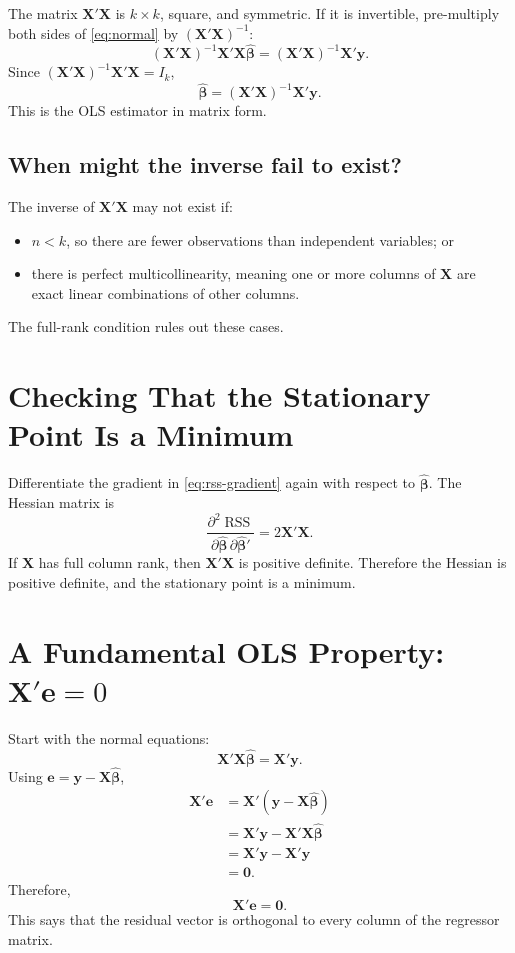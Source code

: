 \documentclass[11pt,a4paper]{article}
\numberwithin{equation}{section}
\newcommand{\bhat}{\hat{\boldsymbol{\beta}}}
\newcommand{\ee}{\mathbf{e}}
\newcommand{\XX}{\mathbf{X}}
\newcommand{\yy}{\mathbf{y}}
\newcommand{\RSS}{\operatorname{RSS}}
\begin{document}
The matrix $\XX'\XX$ is $k\times k$, square, and symmetric. If it is invertible, pre-multiply both sides of \eqref{eq:normal} by $(\XX'\XX)^{-1}$:
\[
(\XX'\XX)^{-1}\XX'\XX\bhat=(\XX'\XX)^{-1}\XX'\yy.
\]
Since $(\XX'\XX)^{-1}\XX'\XX=I_k$,
\begin{equation}
    \boxed{\bhat=(\XX'\XX)^{-1}\XX'\yy.}
    \label{eq:ols-estimator}
\end{equation}
This is the OLS estimator in matrix form.

\subsection{When might the inverse fail to exist?}
The inverse of $\XX'\XX$ may not exist if:
\begin{itemize}
    \item $n<k$, so there are fewer observations than independent variables; or
    \item there is perfect multicollinearity, meaning one or more columns of $\XX$ are exact linear combinations of other columns.
\end{itemize}
The full-rank condition rules out these cases.

\section{Checking That the Stationary Point Is a Minimum}

Differentiate the gradient in \eqref{eq:rss-gradient} again with respect to $\bhat$. The Hessian matrix is
\[
\frac{\partial^2\RSS}{\partial\bhat\,\partial\bhat'}
=2\XX'\XX.
\]
If $\XX$ has full column rank, then $\XX'\XX$ is positive definite. Therefore the Hessian is positive definite, and the stationary point is a minimum.

\section{A Fundamental OLS Property: $\XX'\ee=0$}

Start with the normal equations:
\[
\XX'\XX\bhat=\XX'\yy.
\]
Using $\ee=\yy-\XX\bhat$,
\begin{align*}
\XX'\ee
&=\XX'(\yy-\XX\bhat)\\
&=\XX'\yy-\XX'\XX\bhat\\
&=\XX'\yy-\XX'\yy\\
&=\mathbf{0}.
\end{align*}
Therefore,
\begin{equation}
    \boxed{\XX'\ee=\mathbf{0}.}
    \label{eq:xte}
\end{equation}
This says that the residual vector is orthogonal to every column of the regressor matrix.
\end{document}
